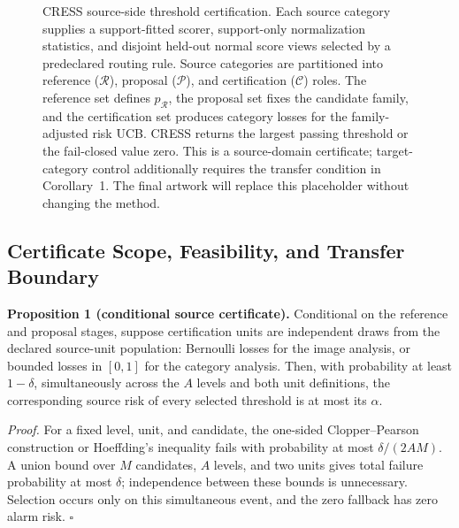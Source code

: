 \begin{figure}[t]
\centering
{}
\caption{CRESS source-side threshold certification. Each source category supplies a support-fitted scorer, support-only normalization statistics, and disjoint held-out normal score views selected by a predeclared routing rule. Source categories are partitioned into reference ($\mathcal R$), proposal ($\mathcal P$), and certification ($\mathcal C$) roles. The reference set defines $p_{\mathcal R}$, the proposal set fixes the candidate family, and the certification set produces category losses for the family-adjusted risk UCB. CRESS returns the largest passing threshold or the fail-closed value zero. This is a source-domain certificate; target-category control additionally requires the transfer condition in Corollary~1. The final artwork will replace this placeholder without changing the method.}
\label{fig:cress-pipeline}
\end{figure}

\subsection{Certificate Scope, Feasibility, and Transfer Boundary}
\noindent\textbf{Proposition 1 (conditional source certificate).} Conditional on the reference and proposal stages, suppose certification units are independent draws from the declared source-unit population: Bernoulli losses for the image analysis, or bounded losses in $[0,1]$ for the category analysis. Then, with probability at least $1-\delta$, simultaneously across the $A$ levels and both unit definitions, the corresponding source risk of every selected threshold is at most its $\alpha$.

\noindent\emph{Proof.} For a fixed level, unit, and candidate, the one-sided Clopper--Pearson construction or Hoeffding's inequality fails with probability at most $\delta/(2AM)$. A union bound over $M$ candidates, $A$ levels, and two units gives total failure probability at most $\delta$; independence between these bounds is unnecessary. Selection occurs only on this simultaneous event, and the zero fallback has zero alarm risk. \hfill$\square$


